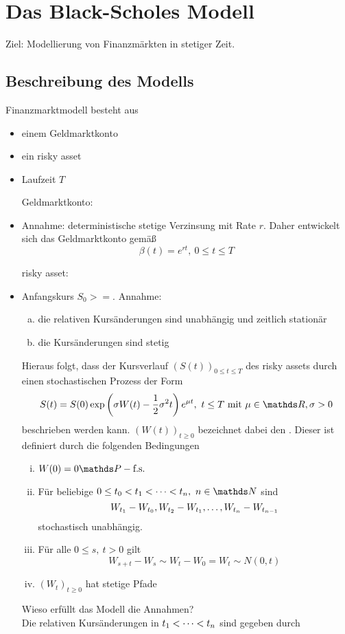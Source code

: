 \section{Das Black-Scholes Modell}
\label{sec:black_scholes_modell}
Ziel: Modellierung von Finanzmärkten in stetiger Zeit.

\subsection{Beschreibung des Modells}
\label{sub:beschreibung_des_modells}
Finanzmarktmodell besteht aus
\begin{itemize}
	\item einem Geldmarktkonto
	\item ein risky asset
	\item Laufzeit $T$
	\item[Geldmarktkonto:]
	\item Annahme: deterministische stetige Verzinsung mit Rate $r$.
	Daher entwickelt sich das Geldmarktkonto gemäß
	\[
	\beta(t)=e^{rt},~0\le t\le T
	\]
	\item[risky asset:]
	\item Anfangskurs $S_0>=$. Annahme:
	\begin{enumerate}[(a)]
		\item die relativen Kursänderungen sind unabhängig und zeitlich stationär
		\item die Kursänderungen sind stetig
	\end{enumerate} 
	Hieraus folgt, dass der Kursverlauf $(S(t))_{0\le t\le T}$ des risky assets durch einen stochastischen Prozess der Form
	\[
	S(t)=S(0)\exp\enbrace{\sigma W(t)-\frac{1}{2}\sigma^2t}e^{\mu t},~t\le T\text{ mit } \mu\in \R,\sigma>0
	\]
	beschrieben werden kann. $(W(t))_{t\ge 0}$ bezeichnet dabei den . Dieser ist definiert durch die folgenden Bedingungen
	\begin{enumerate}[(i)]
		\item $W(0)=0 \pfs$
		\item Für beliebige $0\le t_0<t_1\dt{<}t_n,~n\in \N$ sind 
		\[
		W_{t_1}-W_{t_0},W_{t_2}-W_{t_1}, \dots ,W_{t_n}-W_{t_{n-1}}
		\]
		stochastisch unabhängig.
		\item Für alle $0\le s,~t>0$ gilt
		\[
		W_{s+t}-W_s\sim W_t-W_0=W_t\sim N(0,t)
		\]
		\item $(W_t)_{t\ge0}$ hat stetige Pfade
	\end{enumerate}
	Wieso erfüllt das Modell die Annahmen?\\
	Die relativen Kursänderungen in $t_1< \dots <t_n$ sind gegeben durch

\end{itemize}
